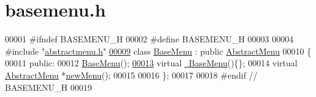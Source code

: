 \hypertarget{basemenu_8h_source}{}\section{basemenu.\+h}
\label{basemenu_8h_source}

\begin{DoxyCode}
00001 \textcolor{preprocessor}{#ifndef BASEMENU\_H}
00002 \textcolor{preprocessor}{#define BASEMENU\_H}
00003 
00004 \textcolor{preprocessor}{#include "\hyperlink{abstractmenu_8h}{abstractmenu.h}"}
\hypertarget{basemenu_8h_source.tex_l00009}{}\hyperlink{classBaseMenu}{00009} \textcolor{keyword}{class }\hyperlink{classBaseMenu}{BaseMenu} : \textcolor{keyword}{public} \hyperlink{classAbstractMenu}{AbstractMenu}
00010 \{
00011 \textcolor{keyword}{public}:
00012     \hyperlink{classBaseMenu_aac7431fdaecc0ecc3a0695511dc8426f}{BaseMenu}();
\hypertarget{basemenu_8h_source.tex_l00013}{}\hyperlink{classBaseMenu_aea8cd4859286c711abee5f54d608cf1a}{00013}     \textcolor{keyword}{virtual} \hyperlink{classBaseMenu_aea8cd4859286c711abee5f54d608cf1a}{~BaseMenu}()\{\};
00014     \textcolor{keyword}{virtual} \hyperlink{classAbstractMenu}{AbstractMenu} *\hyperlink{classBaseMenu_a722bb88987e9a64015c59f3419d89704}{newMenu}();
00015 
00016 \};
00017 
00018 \textcolor{preprocessor}{#endif // BASEMENU\_H}
00019 
\end{DoxyCode}
